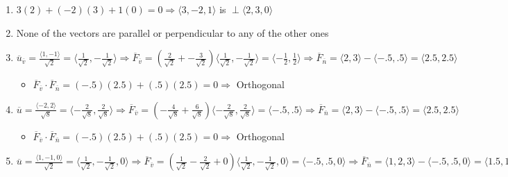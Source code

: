 \begin{enumerate}
  \item $3(2) + (-2)(3) + 1(0) = 0 \Rightarrow \langle 3, -2, 1 \rangle$ is $\perp \langle 2, 3, 0 \rangle$

  \item None of the vectors are parallel or perpendicular to any of the other ones

    \setcounter{enumi}{32}

  \item $\overline{u}_{\overline{v}} = \frac{\langle 1, -1 \rangle}{\sqrt{2}} = \langle \frac{1}{\sqrt{2}}, -\frac{1}{\sqrt{2}} \rangle \Rightarrow \overline{F}_{\overline{v}} = \left( \frac{2}{\sqrt{2}} + -\frac{3}{\sqrt{2}} \right)\langle \frac{1}{\sqrt{2}}, -\frac{1}{\sqrt{2}} \rangle = \langle -\frac{1}{2}, \frac{1}{2} \rangle \Rightarrow \overline{F}_{\overline{n}} = \langle 2, 3 \rangle - \langle -.5, .5 \rangle = \langle 2.5, 2.5 \rangle$

    \begin{itemize}

      \item $\overline{F}_{\overline{v}} \cdot \overline{F}_{\overline{n}} = (-.5)(2.5) + (.5)(2.5) = 0 \Rightarrow$ Orthogonal \textcolor{green}{\checkmark}

    \end{itemize}

  \item $\overline{u} = \frac{\langle -2, 2 \rangle}{\sqrt{8}} = \langle -\frac{2}{\sqrt{8}}, \frac{2}{\sqrt{8}} \rangle \Rightarrow \overline{F}_{\overline{v}} = \left( -\frac{4}{\sqrt{8}} + \frac{6}{\sqrt{8}} \right)\langle -\frac{2}{\sqrt{8}}, \frac{2}{\sqrt{8}} \rangle = \langle -.5, .5 \rangle\Rightarrow \overline{F}_{\overline{n}} = \langle 2, 3 \rangle - \langle -.5, .5 \rangle = \langle 2.5, 2.5 \rangle$

    \begin{itemize}

      \item $\overline{F}_{\overline{v}} \cdot \overline{F}_{\overline{n}} = (-.5)(2.5) + (.5)(2.5) = 0 \Rightarrow$  Orthogonal \textcolor{green}{\checkmark}

    \end{itemize}

  \item $\overline{u} = \frac{\langle 1, -1, 0 \rangle}{\sqrt{2}} = \langle \frac{1}{\sqrt{2}}, -\frac{1}{\sqrt{2}}, 0 \rangle \Rightarrow \overline{F}_{\overline{v}} = \left(\frac{1}{\sqrt{2}} - \frac{2}{\sqrt{2}} + 0 \right)\langle \frac{1}{\sqrt{2}}, -\frac{1}{\sqrt{2}}, 0 \rangle = \langle -.5, .5, 0 \rangle \Rightarrow \overline{F}_{\overline{n}} = \langle 1, 2, 3 \rangle - \langle -.5, .5, 0 \rangle = \langle 1.5, 1.5, 3 \rangle$


\end{enumerate}
